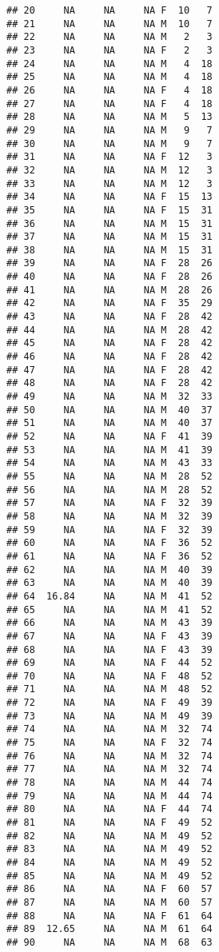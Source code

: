 \documentclass{article}\usepackage[]{graphicx}\usepackage[]{color}
\makeatletter
\newenvironment{kframe}{%
 \def\at@end@of@kframe{}%
 \ifinner\ifhmode%
  \def\at@end@of@kframe{\end{minipage}}%
  \begin{minipage}{\columnwidth}%
 \fi\fi%
 \def\FrameCommand##1{\hskip\@totalleftmargin \hskip-\fboxsep
 \colorbox{shadecolor}{##1}\hskip-\fboxsep
     \hskip-\linewidth \hskip-\@totalleftmargin \hskip\columnwidth}%
 \MakeFramed {\advance\hsize-\width
   \@totalleftmargin\z@ \linewidth\hsize
   \@setminipage}}%
 {\par\unskip\endMakeFramed%
 \at@end@of@kframe}
\newenvironment{knitrout}{}{} %
\makeatother
\begin{document}
\begin{knitrout}
\begin{kframe}
\begin{verbatim}
## 20     NA     NA     NA F  10   7
## 21     NA     NA     NA M  10   7
## 22     NA     NA     NA M   2   3
## 23     NA     NA     NA F   2   3
## 24     NA     NA     NA M   4  18
## 25     NA     NA     NA M   4  18
## 26     NA     NA     NA F   4  18
## 27     NA     NA     NA F   4  18
## 28     NA     NA     NA M   5  13
## 29     NA     NA     NA M   9   7
## 30     NA     NA     NA M   9   7
## 31     NA     NA     NA F  12   3
## 32     NA     NA     NA M  12   3
## 33     NA     NA     NA M  12   3
## 34     NA     NA     NA F  15  13
## 35     NA     NA     NA F  15  31
## 36     NA     NA     NA M  15  31
## 37     NA     NA     NA M  15  31
## 38     NA     NA     NA M  15  31
## 39     NA     NA     NA F  28  26
## 40     NA     NA     NA F  28  26
## 41     NA     NA     NA M  28  26
## 42     NA     NA     NA F  35  29
## 43     NA     NA     NA F  28  42
## 44     NA     NA     NA M  28  42
## 45     NA     NA     NA F  28  42
## 46     NA     NA     NA F  28  42
## 47     NA     NA     NA F  28  42
## 48     NA     NA     NA F  28  42
## 49     NA     NA     NA M  32  33
## 50     NA     NA     NA M  40  37
## 51     NA     NA     NA M  40  37
## 52     NA     NA     NA F  41  39
## 53     NA     NA     NA M  41  39
## 54     NA     NA     NA M  43  33
## 55     NA     NA     NA M  28  52
## 56     NA     NA     NA M  28  52
## 57     NA     NA     NA F  32  39
## 58     NA     NA     NA M  32  39
## 59     NA     NA     NA F  32  39
## 60     NA     NA     NA F  36  52
## 61     NA     NA     NA F  36  52
## 62     NA     NA     NA M  40  39
## 63     NA     NA     NA M  40  39
## 64  16.84     NA     NA M  41  52
## 65     NA     NA     NA M  41  52
## 66     NA     NA     NA M  43  39
## 67     NA     NA     NA F  43  39
## 68     NA     NA     NA F  43  39
## 69     NA     NA     NA F  44  52
## 70     NA     NA     NA F  48  52
## 71     NA     NA     NA M  48  52
## 72     NA     NA     NA F  49  39
## 73     NA     NA     NA M  49  39
## 74     NA     NA     NA M  32  74
## 75     NA     NA     NA F  32  74
## 76     NA     NA     NA M  32  74
## 77     NA     NA     NA M  32  74
## 78     NA     NA     NA M  44  74
## 79     NA     NA     NA M  44  74
## 80     NA     NA     NA F  44  74
## 81     NA     NA     NA F  49  52
## 82     NA     NA     NA M  49  52
## 83     NA     NA     NA M  49  52
## 84     NA     NA     NA M  49  52
## 85     NA     NA     NA M  49  52
## 86     NA     NA     NA F  60  57
## 87     NA     NA     NA M  60  57
## 88     NA     NA     NA F  61  64
## 89  12.65     NA     NA M  61  64
## 90     NA     NA     NA M  68  63

\end{verbatim}
\end{kframe}
\end{knitrout}
\end{document}
